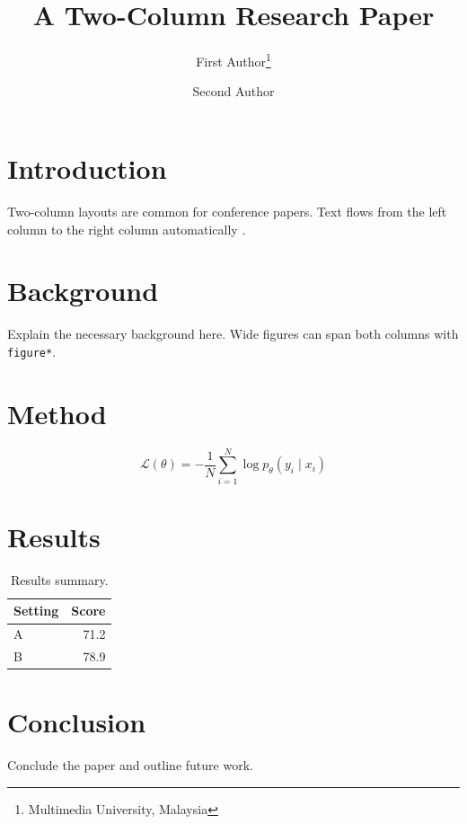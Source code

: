 \documentclass[10pt,a4paper,twocolumn]{article}
\title{\bfseries A Two-Column Research Paper}
\author{First Author\thanks{Multimedia University, Malaysia} \and Second Author\footnotemark[1]}
\date{}
\begin{document}

\section{Introduction}
Two-column layouts are common for conference papers. Text flows from the left column to the right column automatically \cite{ref1}.

\section{Background}
Explain the necessary background here. Wide figures can span both columns with \texttt{figure*}.

\section{Method}
\begin{equation}
    \mathcal{L}(\theta) = -\frac{1}{N} \sum_{i=1}^{N} \log p_\theta(y_i \mid x_i)
\end{equation}

\section{Results}
\begin{table}[h]
    \centering
    \caption{Results summary.}
    \begin{tabular}{lr}
        \toprule
        Setting & Score \\
        \midrule
        A & 71.2 \\
        B & 78.9 \\
        \bottomrule
    \end{tabular}
\end{table}

\section{Conclusion}
Conclude the paper and outline future work.



\end{document}
